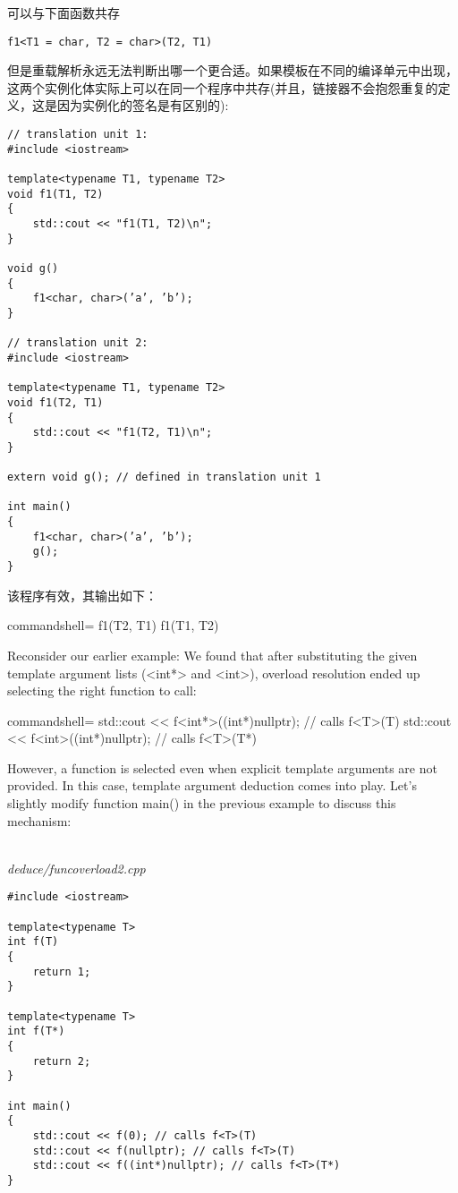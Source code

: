 可以与下面函数共存

\begin{lstlisting}[style=styleCXX]
f1<T1 = char, T2 = char>(T2, T1)
\end{lstlisting}

但是重载解析永远无法判断出哪一个更合适。如果模板在不同的编译单元中出现，这两个实例化体实际上可以在同一个程序中共存(并且，链接器不会抱怨重复的定义，这是因为实例化的签名是有区别的):

\begin{lstlisting}[style=styleCXX]
// translation unit 1:
#include <iostream>

template<typename T1, typename T2>
void f1(T1, T2)
{
	std::cout << "f1(T1, T2)\n";
}

void g()
{
	f1<char, char>(’a’, ’b’);
}

// translation unit 2:
#include <iostream>

template<typename T1, typename T2>
void f1(T2, T1)
{
	std::cout << "f1(T2, T1)\n";
}

extern void g(); // defined in translation unit 1

int main()
{
	f1<char, char>(’a’, ’b’);
	g();
}
\end{lstlisting}

该程序有效，其输出如下：

\begin{tcblisting}{commandshell={}}
f1(T2, T1)
f1(T1, T2)
\end{tcblisting}


Reconsider our earlier example: We found that after substituting the given template argument lists (<int*> and <int>), overload resolution ended up selecting the right function to call:

\begin{tcblisting}{commandshell={}}
std::cout << f<int*>((int*)nullptr); // calls f<T>(T)
std::cout << f<int>((int*)nullptr); // calls f<T>(T*)
\end{tcblisting}

However, a function is selected even when explicit template arguments are not provided. In this case, template argument deduction comes into play. Let’s slightly modify function main() in the previous example to discuss this mechanism:

\hspace*{\fill} \\ %
\noindent
\textit{deduce/funcoverload2.cpp}
\begin{lstlisting}[style=styleCXX]
#include <iostream>

template<typename T>
int f(T)
{
	return 1;
}

template<typename T>
int f(T*)
{
	return 2;
}

int main()
{
	std::cout << f(0); // calls f<T>(T)
	std::cout << f(nullptr); // calls f<T>(T)
	std::cout << f((int*)nullptr); // calls f<T>(T*)
}
\end{lstlisting}

